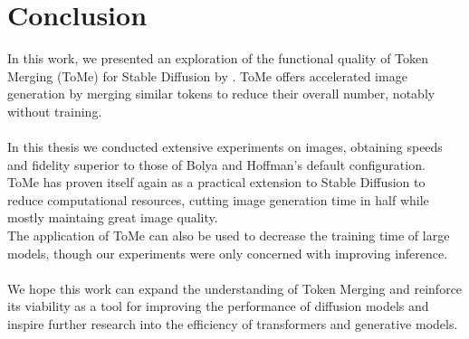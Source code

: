 \section{Conclusion}
In this work, we presented an exploration of the functional quality of Token Merging (ToMe) for Stable Diffusion by \cite{bolya2023tomesd}. ToMe offers accelerated image generation by merging similar tokens to reduce their overall number, notably without training.\\
\\
In this thesis we conducted extensive experiments on images, obtaining speeds and fidelity superior to those of Bolya and Hoffman's default configuration.\\
ToMe has proven itself again as a practical extension to Stable Diffusion to reduce computational resources, cutting image generation time in half while mostly maintaing great image quality.\\
The application of ToMe can also be used to decrease the training time of large models, though our experiments were only concerned with improving inference.\\
\\
We hope this work can expand the understanding of Token Merging and reinforce its viability as a tool for improving the performance of diffusion models and inspire further research into the efficiency of transformers and generative models.